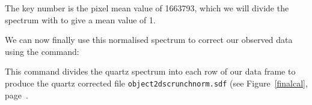\documentclass[twoside,11pt]{starlink}
\providecommand{\scspec}[2]{#1}
\begin{document}
The key number is the pixel mean value of 1663793, which we will
divide the spectrum with to give a mean value of 1.

{\scspec{\small}{ }
\begin{terminalv}
\end{terminalv}
}

We can now finally use this normalised spectrum to correct our
observed data using the 
 command:

{\scspec{\small}{ }
\begin{terminalv}
\end{terminalv}
}

This command divides the quartz spectrum into each row of our data
frame to produce the quartz corrected file \texttt{object2dscrunchnorm.sdf} (see \scspec{Figure~\ref{finalcal},
page~\pageref{finalcal}.}{the figure below.}
\end{document}
